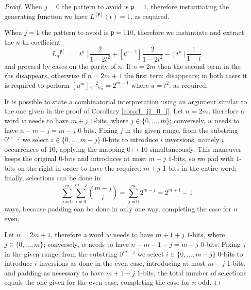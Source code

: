 \begin{proof}
When $j=0$ the pattern to avoid is $\mathfrak{p}=1$, therefore
instantiating the generating function we have $L^{[\mathfrak{p}]}(t) = 1$, as
required.

When $j=1$ the pattern to avoid is $\mathfrak{p}=110$, therefore we instantiate
and extract the $n$-th coefficient
\begin{displaymath}
L_{n}^{[\mathfrak{p}]} = [t^{n}]\frac{2}{1-2t^{2}} + [t^{n-1}]\frac{2}{1-2t^{2}} - [t^{n}]\frac{1}{1-t}
\end{displaymath}
and proceed by cases on the parity of $n$. If $n=2m$ then the second term in
the rhs disappears, otherwise if $n=2m+1$ the first term disappears; in both
cases it is required to perform $[u^{m}]\frac{2}{1-2u} = 2^{m+1}$ where
$u=t^{2}$, as required.

It is possible to state a combinatorial interpretation using an argument
similar to the one given in the proof of Corollary \autoref{coro:1_j1_0_j}.
Let $n=2m$, therefore a word $w$ needs to have $m+j$ $1$-bits, where $j\in
\lbrace 0,\ldots,m \rbrace$; conversely, $w$ needs to have $n-m-j=m-j$ $0$-bits.
Fixing $j$ in the given range, from the substring $0^{m-j}$ we select $i\in
\lbrace 0,\ldots,m-j \rbrace$ $0$-bits  to introduce $i$ inversions, namely $i$
occurrences of $10$, applying the mapping $0\mapsto 10$ simultaneously.  This
maneuver keeps the original $0$-bits  and introduces at most $m-j$ $1$-bits, so
we pad with $1$-bits  on the right in order to have the required $m+j$ $1$-bits
in the entire word; finally, selections can be done in
\begin{displaymath}
    \sum_{j=0}^{m}{\sum_{i=0}^{m-j}{ {{m-j}\choose{i}}} } =
    \sum_{j=0}^{m}{2^{m-j}} =
    2^{m+1}-1
\end{displaymath}
ways, because padding can be done in only one way,
completing the case for $n$ even.

Let $n=2m+1$, therefore a word $w$ needs to have $m+1+j$ $1$-bits, where $j\in
\lbrace 0,\ldots,m \rbrace$; conversely, $w$ needs to have $n-m-1-j=m-j$ $0$-bits.
Fixing $j$ in the given range, from the substring $0^{m-j}$ we select $i\in
\lbrace 0,\ldots,m-j \rbrace$ $0$-bits  to introduce $i$ inversions as done in
the even case, introducing at most $m-j$ $1$-bits,  and padding as necessary to have $m+1+j$
$1$-bits, the total number of selections
equals the one given for the even case, completing the case for $n$ odd.
\end{proof}



